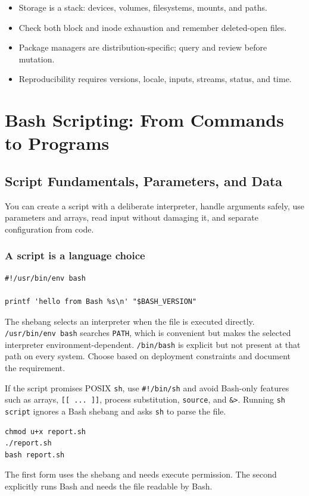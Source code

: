 \documentclass[11pt,oneside,openany]{book}
\newcommand{\chaptergoals}[1]{%
  \begin{tcolorbox}[colback=Paper,colframe=Blue,title={Learning outcomes},fonttitle=\bfseries]
  #1
  \end{tcolorbox}}
\begin{document}
\begin{recapbox}
\begin{itemize}
  \item Storage is a stack: devices, volumes, filesystems, mounts, and paths.
  \item Check both block and inode exhaustion and remember deleted-open files.
  \item Package managers are distribution-specific; query and review before mutation.
  \item Reproducibility requires versions, locale, inputs, streams, status, and time.
\end{itemize}
\end{recapbox}

\part{Bash Scripting: From Commands to Programs}

\chapter{Script Fundamentals, Parameters, and Data}
\chaptergoals{You can create a script with a deliberate interpreter, handle arguments safely, use parameters and arrays, read input without damaging it, and separate configuration from code.}

\section{A script is a language choice}
\begin{lstlisting}
#!/usr/bin/env bash

printf 'hello from Bash %s\n' "$BASH_VERSION"
\end{lstlisting}
The shebang selects an interpreter when the file is executed directly. \texttt{/usr/bin/env bash} searches \texttt{PATH}, which is convenient but makes the selected interpreter environment-dependent. \texttt{/bin/bash} is explicit but not present at that path on every system. Choose based on deployment constraints and document the requirement.

If the script promises POSIX \texttt{sh}, use \texttt{\#!/bin/sh} and avoid Bash-only features such as arrays, \texttt{[[ ... ]]}, process substitution, \texttt{source}, and \texttt{\&>}. Running \texttt{sh script} ignores a Bash shebang and asks \texttt{sh} to parse the file.

\begin{lstlisting}
chmod u+x report.sh
./report.sh
bash report.sh
\end{lstlisting}
The first form uses the shebang and needs execute permission. The second explicitly runs Bash and needs the file readable by Bash.
\end{document}
